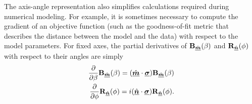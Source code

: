 The axis-angle representation also simplifies calculations required during numerical modeling.  For example, it is sometimes necessary to compute the gradient of an objective function (such as the goodness-of-fit metric that describes the distance between the model and the data) with respect to the model parameters.
%
For fixed axes, the partial derivatives of $\boost$ and $\rotat$ with respect to their angles are simply
%
\begin{align}
\label{eqn:dBoost_dbeta}
\frac{\partial}{\partial\beta}\boost = (\hat{\Pv{m}} \cdot \Pv{\sigma}) \boost \\
\label{eqn:dRotation_dphi}
\frac{\partial}{\partial\phi}\rotat = \Ci (\hat{\Pv{n}} \cdot \Pv{\sigma}) \rotat.
\end{align}
%

\fi
